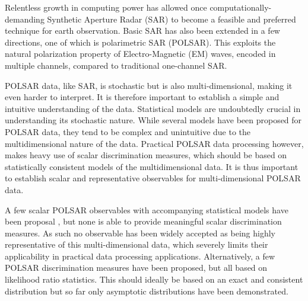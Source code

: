 \documentclass[]{tRSL2e}
\begin{document}
Relentless growth in computing power has allowed once computationally-demanding Synthetic Aperture Radar (SAR)
to become a feasible and preferred technique for earth observation.
Basic SAR has also been extended in a few directions, one of which is polarimetric SAR (POLSAR).
This exploits the natural polarization property of Electro-Magnetic (EM) waves,
  encoded in multiple channels, compared to traditional one-channel SAR.
  

POLSAR data, like SAR, is stochastic but is also multi-dimensional, making it even harder to interpret.
It is therefore important to establish a simple and intuitive understanding of the data.
 Statistical models are undoubtedly crucial in understanding its stochastic nature.
While several %
models have been proposed for POLSAR data, they
   tend to be complex and unintuitive due to the multidimensional nature of the data.
Practical POLSAR data processing however, makes heavy use of scalar discrimination measures,
  which should be based on statistically consistent models %
  of the multidimensional data.
It is thus important to establish scalar and representative observables for multi-dimensional POLSAR data.
  

A few scalar POLSAR observables with accompanying statistical models have been proposal \citep{Conradsen_2003_TGRS_4, Alberga_2008_IJRS_4129, Joughin_1994_TGRS_562, Lee_1994_TGRS_1017, Touzi_1996_TGRS_519, Lopez-Martinez_2003_TGRS_2232, Erten_2012_Sensors_2766},
  but none is able to provide meaningful scalar discrimination measures.
As such no observable has been widely accepted as being highly representative of this multi-dimensional data,
  which severely limits their applicability in practical data processing applications.
Alternatively, a few POLSAR discrimination measures have been proposed,
  but all based on likelihood ratio statistics.
This should ideally be based on an exact and consistent distribution
  but so far only asymptotic distributions have been demonstrated.
\end{document}
